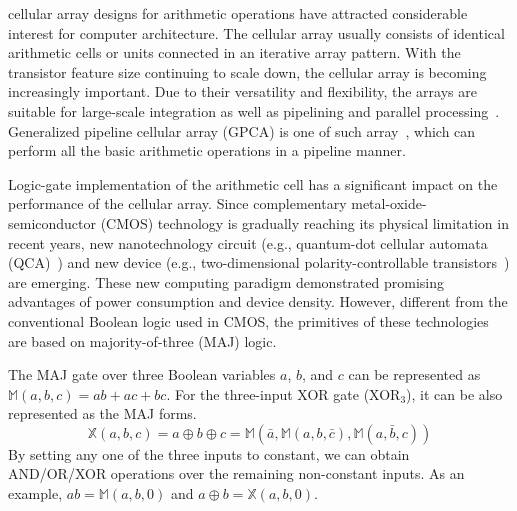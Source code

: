 \documentclass[9pt,journal,compsoc]{IEEEtran}
\begin{document}
\maketitle
\IEEEdisplaynontitleabstractindextext
\IEEEpeerreviewmaketitle
{}%
 cellular array designs for arithmetic operations have attracted considerable interest for computer architecture.
The cellular array usually consists of identical arithmetic cells or units connected in an iterative array pattern.
With the transistor feature size continuing to scale down, the cellular array is becoming increasingly important.
Due to their versatility and flexibility, the arrays are suitable for large-scale integration as well as pipelining and parallel processing~\cite{agrawal1979high,majithia1976some}.   
Generalized pipeline cellular array (GPCA) is one of such array~\cite{4}, which can perform all the basic arithmetic operations in a pipeline manner. 

Logic-gate implementation of the arithmetic cell has a significant impact on the performance of the cellular array.
Since complementary metal-oxide-semiconductor (CMOS) technology is gradually reaching its physical limitation in recent years, new nanotechnology circuit (e.g., quantum-dot cellular automata (QCA)~\cite{1}) and new device (e.g., two-dimensional polarity-controllable transistors~\cite{resta2018doping}) are emerging. 
These new computing paradigm demonstrated promising advantages of power consumption and device density. However, different from the conventional Boolean logic used in CMOS, the primitives of these technologies are based on majority-of-three (MAJ) logic. 

The MAJ gate over three Boolean variables $a$, $b$, and $c$ can be represented as $\mathbb{M}(a,b,c)=ab+ac+bc$.
For the three-input XOR gate (XOR$_3$), it can be also represented as the MAJ forms.  
\begin{equation}\label{equ_xor3}
\mathbb{X}(a,b,c)=a \oplus b \oplus c= \mathbb{M}(\bar a, \mathbb{M}(a,b,\bar c), \mathbb{M}(a,\bar b, c))
\end{equation} 
By setting any one of the three inputs to constant, we can obtain AND/OR/XOR operations over the remaining non-constant inputs.
As an example, $ab=\mathbb{M}(a,b,0)$ and $a\oplus b = \mathbb{X}(a,b,0)$. 
\end{document}
